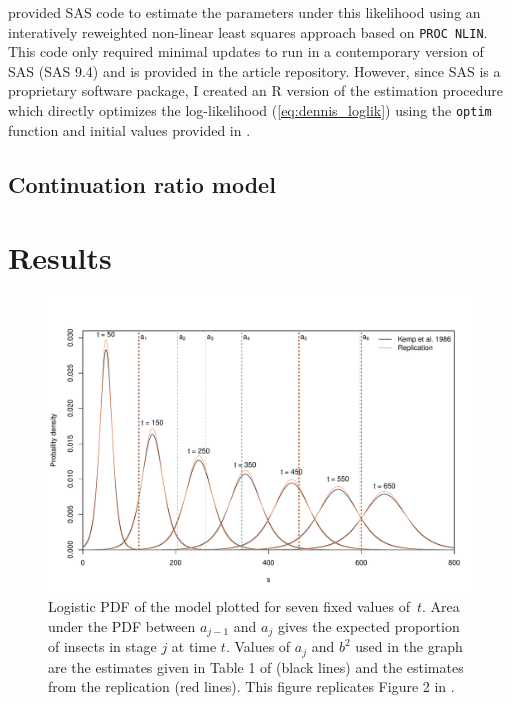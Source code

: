 \citet{dennis1986stochastic} provided SAS code to estimate the parameters under this likelihood using an interatively reweighted non-linear least squares approach based on \verb+PROC NLIN+. This code only required minimal updates to run in a contemporary version of SAS (SAS 9.4) and is provided in the article repository. However, since SAS is a proprietary software package, I created an R version of the estimation procedure which directly optimizes the log-likelihood (\ref{eq:dennis_loglik}) using the \verb+optim+ function and initial values provided in \citep{dennis1986stochastic}.

\citet{dennis1986stochastic}

\subsection{Continuation ratio model}

\section{Results}
\begin{figure}
  \centering
  \includegraphics[width=\textwidth]{../figures/dennis_fig2.pdf}
  \caption{Logistic PDF of the \citet{dennis1986stochastic} model plotted for seven fixed values of~$t$. Area under the PDF between $a_{j-1}$ and $a_j$ gives the expected proportion of insects in stage $j$ at time $t$. Values of $a_j$ and $b^2$ used in the graph are the estimates given in Table 1 of \citep{kemp1986stochastic} (black lines) and the estimates from the replication (red lines). This figure replicates Figure 2 in \citep{dennis1986stochastic}.}
  \label{fig:fig1}
\end{figure}

